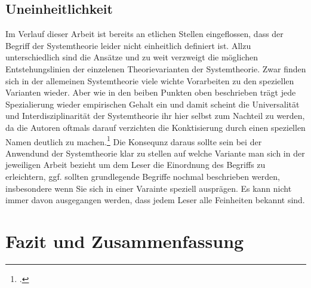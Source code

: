 \documentclass[a4paper,12pt]{article}
\begin{document}
\subsection{Uneinheitlichkeit}
Im Verlauf dieser Arbeit ist bereits an etlichen Stellen eingeflossen, dass der Begriff der Systemtheorie leider nicht einheitlich definiert ist. Allzu unterschiedlich sind die Ansätze und zu weit verzweigt die möglichen Entstehungslinien der einzelenen Theorievarianten der Systemtheorie. Zwar finden sich in der allemeinen Systemtheorie viele wichte Vorarbeiten zu den speziellen Varianten wieder. Aber wie in den beiben Punkten oben beschrieben trägt jede Spezialierung wieder empirischen Gehalt ein und damit scheint die Universalität und Interdisziplinarität der Systemtheorie ihr hier selbst zum Nachteil zu werden, da die Autoren oftmals darauf verzichten die Konktisierung durch einen speziellen Namen deutlich zu machen.\footcite[S. 12]{Luhmann1999} Die Konsequnz daraus sollte sein bei der Anwendund der Systemtheorie klar zu stellen auf welche Variante man sich in der jeweiligen Arbeit bezieht um dem Leser die Einordnung des Begriffs zu erleichtern, ggf. sollten grundlegende Begriffe nochmal beschrieben werden, insbesondere wenn Sie sich in einer Varainte speziell ausprägen. Es kann nicht immer davon ausgegangen werden, dass jedem Leser alle Feinheiten bekannt sind.


\section{Fazit und Zusammenfassung}
\end{document}
